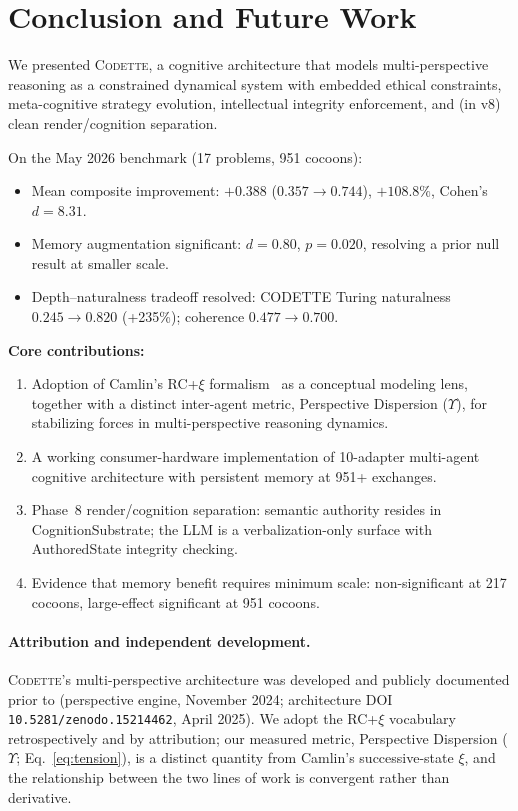 \documentclass[11pt,a4paper]{article}
\newcommand{\codette}{\textsc{Codette}}
\begin{document}
\section{Conclusion and Future Work}
\label{sec:conclusion}

We presented \codette{}, a cognitive architecture that models multi-perspective
reasoning as a constrained dynamical system with embedded ethical constraints,
meta-cognitive strategy evolution, intellectual integrity enforcement, and
(in v8) clean render/cognition separation.

On the May 2026 benchmark (17 problems, 951 cocoons):

\begin{itemize}[nosep]
  \item Mean composite improvement: $+0.388$ ($0.357 \to 0.744$), $+108.8\%$,
    Cohen's $d=8.31$.
  \item Memory augmentation significant: $d=0.80$, $p=0.020$, resolving a
    prior null result at smaller scale.
  \item Depth--naturalness tradeoff resolved: CODETTE Turing naturalness
    $0.245 \to 0.820$ (+235\%); coherence $0.477 \to 0.700$.
\end{itemize}

\textbf{Core contributions:}

\begin{enumerate}[nosep]
  \item Adoption of Camlin's RC+$\xi$ formalism~\citep{camlin2025consciousness}
    as a conceptual modeling lens, together with a distinct inter-agent metric,
    Perspective Dispersion ($\Upsilon$), for stabilizing forces in
    multi-perspective reasoning dynamics.
  \item A working consumer-hardware implementation of 10-adapter multi-agent
    cognitive architecture with persistent memory at 951+ exchanges.
  \item Phase~8 render/cognition separation: semantic authority resides in
    CognitionSubstrate; the LLM is a verbalization-only surface with
    AuthoredState integrity checking.
  \item Evidence that memory benefit requires minimum scale: non-significant
    at 217 cocoons, large-effect significant at 951 cocoons.
\end{enumerate}

\paragraph{Attribution and independent development.}
\codette{}'s multi-perspective architecture was developed and publicly
documented prior to \citet{camlin2025consciousness} (perspective engine,
November 2024; architecture DOI \texttt{10.5281/zenodo.15214462}, April 2025).
We adopt the RC+$\xi$ vocabulary retrospectively and by attribution; our
measured metric, Perspective Dispersion ($\Upsilon$; Eq.~\ref{eq:tension}), is
a distinct quantity from Camlin's successive-state $\xi$, and the relationship
between the two lines of work is convergent rather than derivative.
\end{document}
